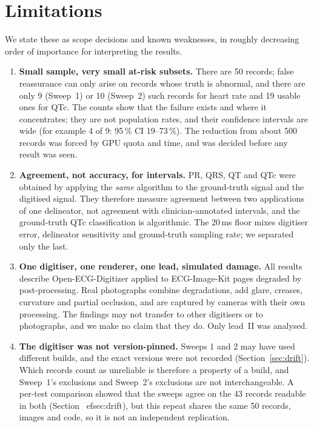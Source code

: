 \section{Limitations}\label{sec:limitations}

We state these as scope decisions and known weaknesses, in roughly decreasing order of importance for interpreting the results.

\begin{enumerate}
\item \textbf{Small sample, very small at-risk subsets.} There are 50 records; false reassurance can only arise on records whose truth is abnormal, and there are only 9 (Sweep~1) or 10 (Sweep~2) such records for heart rate and 19 usable ones for QTc. The counts show that the failure exists and where it concentrates; they are not population rates, and their confidence intervals are wide (for example 4 of 9: 95\,\% CI 19--73\,\%). The reduction from about 500 records was forced by GPU quota and time, and was decided before any result was seen.
\item \textbf{Agreement, not accuracy, for intervals.} PR, QRS, QT and QTc were obtained by applying the \emph{same} algorithm to the ground-truth signal and the digitised signal. They therefore measure agreement between two applications of one delineator, not agreement with clinician-annotated intervals, and the ground-truth QTc classification is algorithmic. The 20\,ms floor mixes digitiser error, delineator sensitivity and ground-truth sampling rate; we separated only the last.
\item \textbf{One digitiser, one renderer, one lead, simulated damage.} All results describe Open-ECG-Digitizer applied to ECG-Image-Kit pages degraded by post-processing. Real photographs combine degradations, add glare, creases, curvature and partial occlusion, and are captured by cameras with their own processing. The findings may not transfer to other digitisers or to photographs, and we make no claim that they do. Only lead~II was analysed.
\item \textbf{The digitiser was not version-pinned.} Sweeps 1 and 2 may have used different builds, and the exact versions were not recorded (Section~\ref{sec:drift}). Which records count as unreliable is therefore a property of a build, and Sweep~1's exclusions and Sweep~2's exclusions are not interchangeable. A per-test comparison showed that the sweeps agree on the 43 records readable in both (Section~
ef{sec:drift}), but this repeat shares the same 50 records, images and code, so it is not an independent replication.

\end{enumerate}
